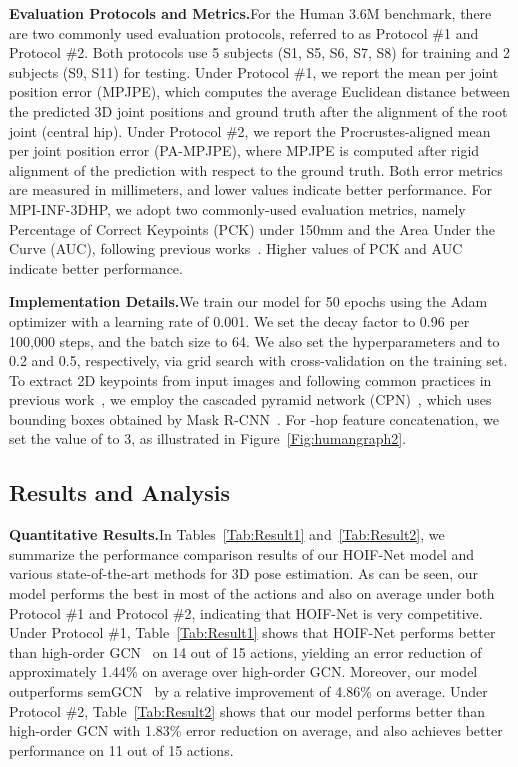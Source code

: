 \documentclass{bmvc2k}
\begin{document}
\medskip\noindent\textbf{Evaluation Protocols and Metrics.}\quad For the Human 3.6M benchmark, there are two commonly used evaluation protocols, referred to as Protocol \#1 and Protocol \#2. Both protocols use 5 subjects (S1, S5, S6, S7, S8) for training and 2 subjects (S9, S11) for testing. Under Protocol \#1, we report the mean per joint position error (MPJPE), which computes the average Euclidean distance between the predicted 3D joint positions and ground truth after the alignment of the root joint (central
hip). Under Protocol \#2, we report the Procrustes-aligned mean per joint position error (PA-MPJPE), where MPJPE is computed after rigid alignment of the prediction with respect to the ground truth. Both error metrics are measured in millimeters, and lower values indicate better performance. For MPI-INF-3DHP, we adopt two commonly-used evaluation metrics, namely Percentage of Correct Keypoints (PCK) under 150mm and the Area Under the Curve (AUC), following previous works~\cite{yang20183d,pavlakos2018ordinal,Habibie:19}. Higher values of PCK and AUC indicate better performance.

\medskip\noindent\textbf{Implementation Details.}\quad We train our model for 50 epochs using the Adam optimizer with a learning rate of 0.001. We set the decay factor to 0.96 per 100,000 steps, and the batch size to 64. We also set the hyperparameters  and  to 0.2 and 0.5, respectively, via grid search with cross-validation on the training set. To extract 2D keypoints from input images and following common practices in previous work~\cite{pavllo20193d,zou2020high}, we employ the cascaded pyramid network (CPN)~\cite{chen2018cascaded}, which uses bounding boxes obtained by Mask R-CNN~\cite{KHe:17}. For -hop feature concatenation, we set the value of  to 3, as illustrated in Figure~\ref{Fig:humangraph2}.

\subsection{Results and Analysis}
\noindent\textbf{Quantitative Results.}\quad In Tables~\ref{Tab:Result1} and~\ref{Tab:Result2}, we summarize the performance comparison results of our HOIF-Net model and various state-of-the-art methods for 3D pose estimation. As can be seen, our model performs the best in most of the actions and also on average under both Protocol \#1 and Protocol \#2, indicating that HOIF-Net is very competitive. Under Protocol \#1, Table~\ref{Tab:Result1} shows that HOIF-Net performs better than high-order GCN~\cite{zou2020high} on 14 out of 15 actions, yielding an error reduction of approximately 1.44\% on average over high-order GCN. Moreover, our model outperforms semGCN~\cite{zhao2019semantic} by a relative improvement of 4.86\% on average. Under Protocol \#2, Table~\ref{Tab:Result2} shows that our model performs better than high-order GCN with 1.83\% error reduction on average, and also achieves better performance on 11 out of 15 actions.
\end{document}
